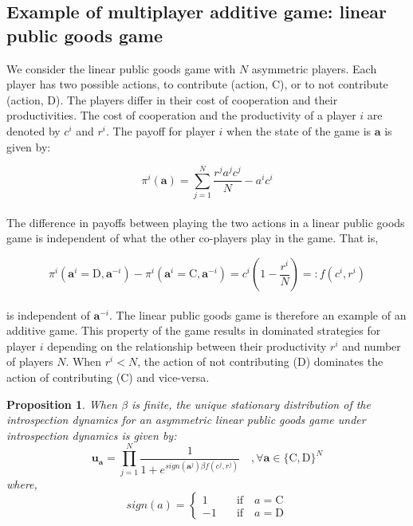 \documentclass[11pt]{article}
\theoremstyle{plainCl1}
\newtheorem{Prop}{Proposition}
\theoremstyle{plainCl2}
\newcommand{\abf}{\mathbf{a}}
\newcommand{\ubf}{\mathbf{u}}
\newcommand{\C}{\mathrm{C}}
\newcommand{\D}{\mathrm{D}}
\begin{document}
\subsection*{Example of multiplayer additive game: linear public goods game}
We consider the linear public goods game with $N$ asymmetric players. Each player has two possible actions, to contribute (action, $\C$), or to not contribute (action, $\D$). The players differ in their cost of cooperation and their productivities. The cost of cooperation and the productivity of a player $i$ are denoted by $c^i$ and $r^i$.  The payoff for player $i$ when the state of the game is $\abf$ is given by: 

\begin{equation}
\pi^i(\abf) = \sum_{j=1}^N \frac{\displaystyle r^j a^j c^j}{N} - a^i c^i
\label{Eq:linear-pgg-payoff}
\end{equation}
\\
\noindent The difference in payoffs between playing the two actions in a linear public goods game is independent of what the other co-players play in the game. That is, 

\begin{equation}
\pi^i(\abf^i = \D, \abf^{-i}) - \pi^i(\abf^i = \C, \abf^{-i}) = c^i \left(1 - \frac{r^i}{N} \right) =: f(c^i, r^i) 
\label{Eq:difference-payoffs-lpgg}
\end{equation}
\\
\noindent is independent of $\abf^{-i}$. The linear public goods game is therefore an example of an additive game. This property of the game results in dominated strategies for player $i$ depending on the relationship between their productivity $r^i$ and number of players $N$. When $r^i < N$, the action of not contributing ($\D$) dominates the action of contributing ($\C$) and vice-versa. 
\\
\begin{Prop}
\label{prop:stationary-dist-lpgg}
When $\beta$ is finite, the unique stationary distribution of the introspection dynamics for an asymmetric linear public goods game under introspection dynamics is given by: 
\\
\begin{equation}
\ubf_\abf = \prod_{j = 1}^{N} \frac{1}{1 + \displaystyle e^{\mathit{sign}(\abf^j)\beta f(c^j, r^j )}} \quad ,\forall \abf \in \{\C, \D\}^N
\label{Eq:stationary_dist_lpgg}
\end{equation}
where, 
\begin{equation}
\label{Eq:sign-function}
\mathit{sign}(a) =
\begin{cases}
1& \quad \text{if} \quad a = \C \\
-1& \quad \text{if} \quad a = \D
\end{cases}
\end{equation}
\end{Prop}
\end{document}

